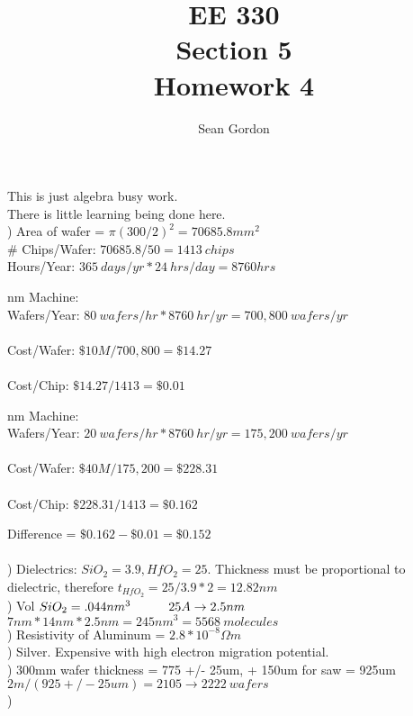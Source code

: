 \documentclass[12pt]{article}
\title{EE 330\\Section 5\\Homework 4}
\author{Sean Gordon}
\begin{document}
\maketitle
This is just algebra busy work.\\\indent There is little learning being done here.\\


) Area of wafer = $\pi (300/2)^2 = 70685.8mm^2$\\
\# Chips/Wafer: $70685.8/50 = 1413\ chips$\\
Hours/Year: $365\ days/yr * 24\ hrs/day = 8760 hrs$ \\
\begin{multicols}{2}

 nm Machine:\\
Wafers/Year: $80\ wafers/hr * 8760\ hr/yr = 700,800\ wafers/yr$\\ \\
Cost/Wafer: $\$10M/700,800=\$14.27$\\ \\
Cost/Chip: $\$14.27 / 1413 = \$0.01$


 nm Machine:\\
Wafers/Year: $20\ wafers/hr * 8760\ hr/yr = 175,200\ wafers/yr$\\ \\
Cost/Wafer: $\$40M/175,200=\$228.31$\\ \\
Cost/Chip: $\$228.31 / 1413 = \$0.162$

\end{multicols} 
\noindent Difference = $\$0.162 - \$0.01 = \$0.152$\\\\


) Dielectrics: $SiO_2 = 3.9, HfO_2 = 25$.
Thickness must be proportional to dielectric, therefore $t_{HfO_2} = 25/3.9 * 2 = 12.82 nm$\\

) Vol $SiO_2 = .044nm^3\indent \indent 25 A \to 2.5 nm$\\
$7nm * 14nm * 2.5nm = 245 nm ^3 = 5568\ molecules$\\

) Resistivity of Aluminum = $2.8*10^{-8}\Omega m$\\


) Silver. Expensive with high electron migration potential.\\ 


) 300mm wafer thickness = 775 +/- 25um, + 150um for saw = 925um\\
$2m / (925 +/- 25um ) = 2105 \to 2222\ wafers$\\

)
\end{document}
